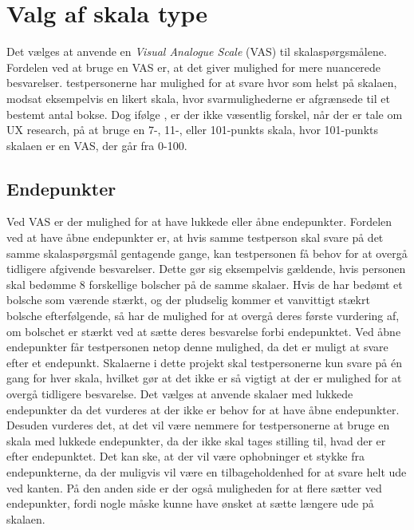 \section{Valg af skala type}
\label{ParametreSkalaType}
%
Det vælges at anvende en \textit{Visual Analogue Scale} (VAS) til skalaspørgsmålene. Fordelen ved at bruge en VAS er, at det giver mulighed for mere nuancerede besvarelser. testpersonerne har mulighed for at svare hvor som helst på skalaen, modsat eksempelvis en likert skala, hvor svarmulighederne er afgrænsede til et bestemt antal bokse.
Dog ifølge \textcite[s. 73]{PDF:RatingScales}, er der ikke væsentlig forskel, når der er tale om UX research, på at bruge en 7-, 11-, eller 101-punkts skala, hvor 101-punkts skalaen er en VAS, der går fra 0-100.
%
\subsection{Endepunkter}
Ved VAS er der mulighed for at have lukkede eller åbne endepunkter. Fordelen ved at have åbne endepunkter er, at hvis samme testperson skal svare på det samme skalaspørgsmål gentagende gange, kan testpersonen få behov for at overgå tidligere afgivende besvarelser. Dette gør sig eksempelvis gældende, hvis personen skal bedømme 8 forskellige bolscher på de samme skalaer. Hvis de har bedømt et bolsche som værende stærkt, og der pludselig kommer et vanvittigt stækrt bolsche efterfølgende, så har de mulighed for at overgå deres første vurdering af, om bolschet er stærkt ved at sætte deres besvarelse forbi endepunktet. Ved åbne endepunkter får testpersonen netop denne mulighed, da det er muligt at svare efter et endepunkt. Skalaerne i dette projekt skal testpersonerne kun svare på én gang for hver skala, hvilket gør at det ikke er så vigtigt at der er mulighed for at overgå tidligere besvarelse. \blankline
%
Det vælges at anvende skalaer med lukkede endepunkter da det vurderes at der ikke er behov for at have åbne endepunkter. Desuden vurderes det, at det vil være nemmere for testpersonerne at bruge en skala med lukkede endepunkter, da der ikke skal tages stilling til, hvad der er efter endepunktet. Det kan ske, at der vil være ophobninger et stykke fra endepunkterne, da der muligvis vil være en tilbageholdenhed for at svare helt ude ved kanten. På den anden side er der også muligheden for at flere sætter ved endepunkter, fordi nogle måske kunne have ønsket at sætte længere ude på skalaen. 
%
%
